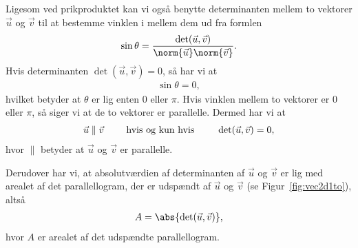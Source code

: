 Ligesom ved prikproduktet kan vi også benytte determinanten mellem to vektorer $\vec{u}$ og $\vec{v}$ til at bestemme vinklen i mellem dem ud fra formlen
\begin{align}\label{eq:vec2d1vinkelveddeterminant}
\sin \theta = \frac{\det(\vec{u},\vec{v})}{\norm{\vec{u}}\norm{\vec{v}}}.
\end{align}
Hvis determinanten $\det(\vec{u}, \vec{v})=0$, så har vi at 
\begin{align*}
\sin \theta = 0,
\end{align*}
hvilket betyder at $\theta$ er lig enten $0$ eller $\pi$. Hvis vinklen mellem to vektorer er $0$ eller $\pi$, så siger vi at de to vektorer er parallelle. Dermed har vi at 
\begin{align*}
\vec{u} \parallel \vec{v} \qquad \textup{ hvis og kun hvis } \qquad \det(\vec{u}, \vec{v}) = 0,
\end{align*}
hvor $\parallel$ betyder at $\vec{u}$ og $\vec{v}$ er parallelle.

Derudover har vi, at absolutværdien af determinanten af $\vec{u}$ og $\vec{v}$ er lig med arealet af det parallellogram, der er udspændt af $\vec{u}$ og $\vec{v}$ (se Figur~\ref{fig:vec2d1to}), altså
\begin{align*}
A = \abs{\det( \vec{u},\vec{v} )},
\end{align*}
hvor $A$ er arealet af det udspændte parallellogram.

